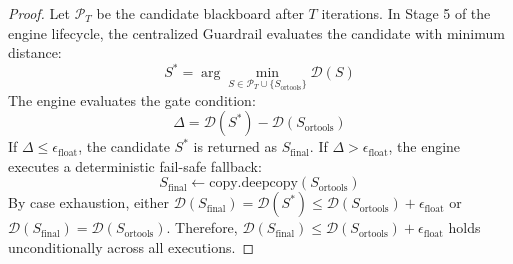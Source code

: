 \begin{proof}
Let $\mathcal{P}_T$ be the candidate blackboard after $T$ iterations. In Stage 5 of the engine lifecycle, the centralized Guardrail evaluates the candidate with minimum distance:
\begin{equation}
S^* = \arg\min_{S \in \mathcal{P}_T \cup \{S_{\text{ortools}}\}} \mathcal{D}(S)
\end{equation}
The engine evaluates the gate condition:
\begin{equation}
\Delta = \mathcal{D}(S^*) - \mathcal{D}(S_{\text{ortools}})
\end{equation}
If $\Delta \le \epsilon_{\text{float}}$, the candidate $S^*$ is returned as $S_{\text{final}}$. If $\Delta > \epsilon_{\text{float}}$, the engine executes a deterministic fail-safe fallback:
\begin{equation}
S_{\text{final}} \leftarrow \text{copy.deepcopy}(S_{\text{ortools}})
\end{equation}
By case exhaustion, either $\mathcal{D}(S_{\text{final}}) = \mathcal{D}(S^*) \le \mathcal{D}(S_{\text{ortools}}) + \epsilon_{\text{float}}$ or $\mathcal{D}(S_{\text{final}}) = \mathcal{D}(S_{\text{ortools}})$. Therefore, $\mathcal{D}(S_{\text{final}}) \le \mathcal{D}(S_{\text{ortools}}) + \epsilon_{\text{float}}$ holds unconditionally across all executions.
\end{proof}
